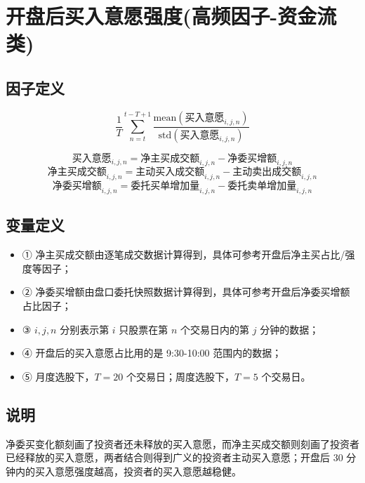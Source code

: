\documentclass{article}
\begin{document}
\section{开盘后买入意愿强度(高频因子-资金流类)}

\subsection{因子定义}

\begin{equation}
    \frac{1}{T} \sum_{n=t}^{t-T+1} \frac{\mathrm{mean}(\text{买入意愿}_{i,j,n})}{\mathrm{std}(\text{买入意愿}_{i,j,n})}
\end{equation}

\begin{equation}
    \text{买入意愿}_{i,j,n} = \text{净主买成交额}_{i,j,n} - \text{净委买增额}_{i,j,n}
\end{equation}
\begin{equation}
    \text{净主买成交额}_{i,j,n} = \text{主动买入成交额}_{i,j,n} - \text{主动卖出成交额}_{i,j,n}
\end{equation}
\begin{equation}
    \text{净委买增额}_{i,j,n} = \text{委托买单增加量}_{i,j,n} - \text{委托卖单增加量}_{i,j,n}
\end{equation}


\subsection{变量定义}
\begin{itemize}
    \item ① 净主买成交额由逐笔成交数据计算得到，具体可参考开盘后净主买占比/强度等因子；
    \item ② 净委买增额由盘口委托快照数据计算得到，具体可参考开盘后净委买增额占比因子；
    \item ③ \( i, j, n \) 分别表示第 \( i \) 只股票在第 \( n \) 个交易日内的第 \( j \) 分钟的数据；
    \item ④ 开盘后的买入意愿占比用的是 9:30-10:00 范围内的数据；
    \item ⑤ 月度选股下，\( T=20 \) 个交易日；周度选股下，\( T=5 \) 个交易日。
\end{itemize}

\subsection{说明}
净委买变化额刻画了投资者还未释放的买入意愿，而净主买成交额则刻画了投资者已经释放的买入意愿，两者结合则得到广义的投资者主动买入意愿；开盘后 30 分钟内的买入意愿强度越高，投资者的买入意愿越稳健。
\end{document}

